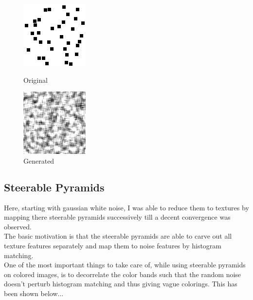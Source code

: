 \documentclass{article}
\begin{document}
    \begin{figure}[!htb]
    \begin{center}
      \includegraphics[scale=1.2]{5/report/random/9.png}
      \caption{Original}
    \end{center}
    \endminipage \hfill
    \begin{center}
      \includegraphics[scale=1.2]{5/report/random/9_c.png}
      \caption{Generated}
    \end{center}
    \endminipage
    \end{figure}

    \pagebreak
    \subsection*{Steerable Pyramids}
    Here, starting with gaussian white noise, I was able to reduce them to textures by mapping there steerable pyramids successively till a decent convergence was observed.\\
    The basic motivation is that the steerable pyramids are able to carve out all texture features separately and map them to noise features by histogram matching.\\
    One of the most important things to take care of, while using steerable pyramids on colored images, is to decorrelate the color bands such that the random noise doesn't perturb histogram matching and thus giving vague colorings. This has been shown below...\\
    
\end{document}
